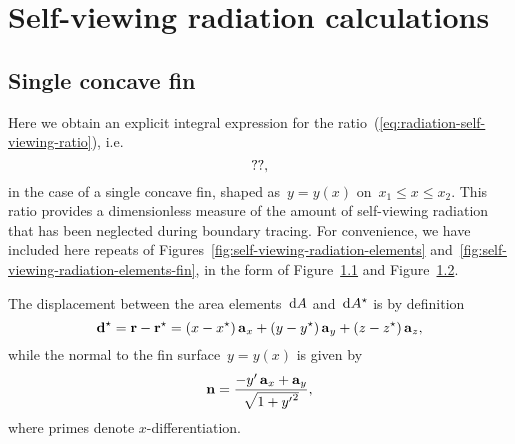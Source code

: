 \chapter{Self-viewing radiation calculations}
\label{ch:self-viewing}

\section{Single concave fin}
\label{sec:self-viewing.fin}

\begin{figure}
  \label{fig:self-viewing-radiation-elements-appendix}
\end{figure}

\begin{figure}
  \label{fig:self-viewing-radiation-elements-fin-appendix}
\end{figure}

Here we obtain an explicit integral expression
for the ratio~(\ref{eq:radiation-self-viewing-ratio}),
i.e.
\begin{equation}
  \usecontent{eq:radiation-self-viewing-ratio},
  \label{eq:radiation-self-viewing-ratio-appendix}
\end{equation}
in the case of a single concave fin,
shaped as~$y = y (x)$ on~$x_1 \le x \le x_2$.
This ratio provides a dimensionless measure
of the amount of self-viewing radiation
that has been neglected during boundary tracing.
For convenience, we have included here
repeats of Figures~\ref{fig:self-viewing-radiation-elements}
and~\ref{fig:self-viewing-radiation-elements-fin},
in the form of Figure~\ref{fig:self-viewing-radiation-elements-appendix}
and Figure~\ref{fig:self-viewing-radiation-elements-fin-appendix}.

The displacement between the area elements~$\mathop{}\!\mathrm{d} A$ and~$\mathop{}\!\mathrm{d} A^\star$ is
by definition
\begin{equation}
  \boldsymbol{\mathbf{d}}^\star
    =
      \boldsymbol{\mathbf{r}} - \boldsymbol{\mathbf{r}}^\star \\
    =
      (x - x^\star) \mathop{}\!\boldsymbol{\mathbf{a}}_{x}
        +
      (y - y^\star) \mathop{}\!\boldsymbol{\mathbf{a}}_{y}
        +
      (z - z^\star) \mathop{}\!\boldsymbol{\mathbf{a}}_{z},
  \label{eq:radiation-self-viewing-displacement-appendix}
\end{equation}
while the normal to the fin surface~$y = y (x)$ is given by
\begin{equation}
  \mathop{}\!\boldsymbol{\mathbf{n}} =
    \frac{
      -y' \mathop{}\!\boldsymbol{\mathbf{a}}_{x} + \mathop{}\!\boldsymbol{\mathbf{a}}_{y}
    }{
      \sqrt{1 + {y'}^2}
    },
  \label{eq:radiation-self-viewing-normal-vector}
\end{equation}
where primes denote $x$-differentiation.


